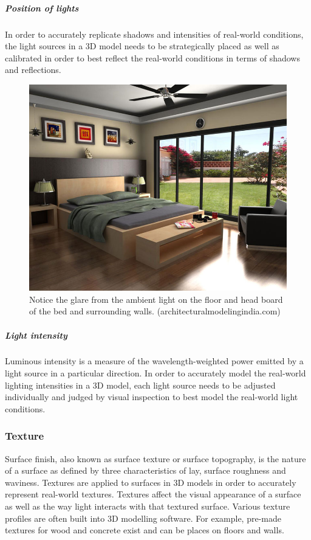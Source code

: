 \documentclass[11pt,a4paper]{report}
\begin{document}
					\subparagraph{Position of lights}
						In order to accurately replicate shadows and intensities of real-world conditions, the light sources in a 3D model needs to be strategically placed as well as calibrated in order to best reflect the real-world conditions in terms of shadows and reflections.
						
						\begin{figure}[H]
							\centering
							\includegraphics[width=1\textwidth]{light_glare}
							\caption[Light glare]{Notice the glare from the ambient light on the floor and head board of the bed and surrounding walls. (architecturalmodelingindia.com)}
						\end{figure}
					
					\subparagraph{Light intensity}
						Luminous intensity is a measure of the wavelength-weighted power emitted by a light source in a particular direction. In order to accurately model the real-world lighting intensities in a 3D model, each light source needs to be adjusted individually and judged by visual inspection to best model the real-world light conditions.
						
			\subsubsection{Texture}
				Surface finish, also known as surface texture or surface topography, is the nature of a surface as defined by three characteristics of lay, surface roughness and waviness.
				\cite{e._paul_degarmo_materials_2003}
				Textures are applied to surfaces in 3D models in order to accurately represent real-world textures. Textures affect the visual appearance of a surface as well as the way light interacts with that textured surface. Various texture profiles are often built into 3D modelling software. For example, pre-made textures for wood and concrete exist and can be places on floors and walls.
			
\end{document}
